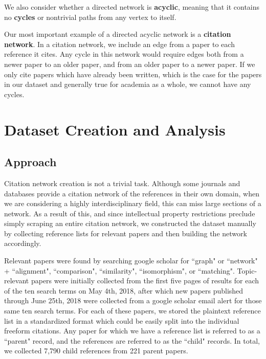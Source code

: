 \documentclass[12pt]{thesis}
\theoremstyle{plain}
\theoremstyle{definition}
\theoremstyle{remark}
\begin{document}
We also consider whether a directed network is \textbf{acyclic}, meaning that it contains no \textbf{cycles} or nontrivial paths from any vertex to itself.

Our most important example of a directed acyclic network is a \textbf{citation network}. In a citation network, we include an edge from a paper to each reference it cites. Any cycle in this network would require edges both from a newer paper to an older paper, and from an older paper to a newer paper. If we only cite papers which have already been written, which is the case for the papers in our dataset and generally true for academia as a whole, we cannot have any cycles. 

















\chapter{Dataset Creation and Analysis}\label{chapter:dataset_creation_and_analysis}




\section{Approach}

Citation network creation is not a trivial task. Although some journals and databases provide a citation network of the references in their own domain, when we are considering a highly interdisciplinary field, this can miss large sections of a network. As a result of this, and since intellectual property restrictions preclude simply scraping an entire citation network, we constructed the dataset manually by collecting reference lists for relevant papers and then building the network accordingly.

Relevant papers were found by searching google scholar for ``graph" or ``network" +  ``alignment", ``comparison", ``similarity", ``isomorphism", or ``matching". Topic-relevant papers were initially collected from the first five pages of results for each of the ten search terms on May 4th, 2018, after which new papers published through June 25th, 2018 were collected from a google scholar email alert for those same ten search terms. For each of these papers, we stored the plaintext reference list in a standardized format which could be easily split into the individual freeform citations. Any paper for which we have a reference list is referred to as a ``parent" record, and the references are referred to as the ``child" records. In total, we collected 7,790 child references from 221 parent papers.
\end{document}
